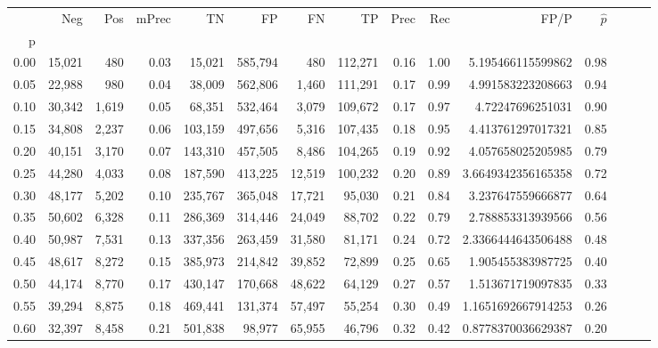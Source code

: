 \begin{tabular}{rrrrrrrrrrrrrrr}
\toprule
{} &     Neg &    Pos & mPrec &       TN &       FP &       FN &       TP &  Prec &   Rec &                 FP/P & $\hat{p}$ \\
p    &         &        &       &          &          &          &          &       &       &                      &           \\
\midrule
0.00 &  15,021 &    480 &  0.03 &   15,021 &  585,794 &      480 &  112,271 &  0.16 &  1.00 &    5.195466115599862 &      0.98 \\
0.05 &  22,988 &    980 &  0.04 &   38,009 &  562,806 &    1,460 &  111,291 &  0.17 &  0.99 &    4.991583223208663 &      0.94 \\
0.10 &  30,342 &  1,619 &  0.05 &   68,351 &  532,464 &    3,079 &  109,672 &  0.17 &  0.97 &     4.72247696251031 &      0.90 \\
0.15 &  34,808 &  2,237 &  0.06 &  103,159 &  497,656 &    5,316 &  107,435 &  0.18 &  0.95 &    4.413761297017321 &      0.85 \\
0.20 &  40,151 &  3,170 &  0.07 &  143,310 &  457,505 &    8,486 &  104,265 &  0.19 &  0.92 &    4.057658025205985 &      0.79 \\
0.25 &  44,280 &  4,033 &  0.08 &  187,590 &  413,225 &   12,519 &  100,232 &  0.20 &  0.89 &   3.6649342356165358 &      0.72 \\
0.30 &  48,177 &  5,202 &  0.10 &  235,767 &  365,048 &   17,721 &   95,030 &  0.21 &  0.84 &    3.237647559666877 &      0.64 \\
0.35 &  50,602 &  6,328 &  0.11 &  286,369 &  314,446 &   24,049 &   88,702 &  0.22 &  0.79 &    2.788853313939566 &      0.56 \\
0.40 &  50,987 &  7,531 &  0.13 &  337,356 &  263,459 &   31,580 &   81,171 &  0.24 &  0.72 &   2.3366444643506488 &      0.48 \\
0.45 &  48,617 &  8,272 &  0.15 &  385,973 &  214,842 &   39,852 &   72,899 &  0.25 &  0.65 &    1.905455383987725 &      0.40 \\
0.50 &  44,174 &  8,770 &  0.17 &  430,147 &  170,668 &   48,622 &   64,129 &  0.27 &  0.57 &    1.513671719097835 &      0.33 \\
0.55 &  39,294 &  8,875 &  0.18 &  469,441 &  131,374 &   57,497 &   55,254 &  0.30 &  0.49 &   1.1651692667914253 &      0.26 \\
0.60 &  32,397 &  8,458 &  0.21 &  501,838 &   98,977 &   65,955 &   46,796 &  0.32 &  0.42 &   0.8778370036629387 &      0.20 \\

\end{tabular}
